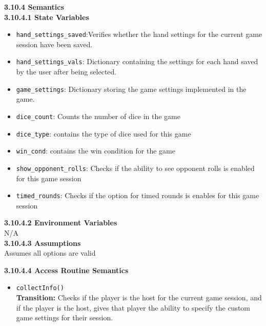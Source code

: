 \documentclass[12pt, titlepage]{article}
\begin{document}
\noindent \textbf{3.10.4 Semantics}\\
\textbf{3.10.4.1 State Variables}\\
\begin{itemize}
	\item \texttt{hand\_settings\_saved}:Verifies whether the hand settings for the current game session have been saved.
	\item \texttt{hand\_settings\_vals}: Dictionary containing the settings for each hand saved by the user after being selected.
	\item \texttt{game\_settings}: Dictionary storing the game settings implemented in the game.
	\item \texttt{dice\_count}: Counts the number of dice in the game
	\item \texttt{dice\_type}: contains the type of dice used for this game
	\item \texttt{win\_cond}: contains the win condition for the game
	\item \texttt{show\_opponent\_rolls}: Checks if the ability to see opponent rolls is enabled for this game session
	\item \texttt{timed\_rounds}: Checks if the option for timed rounds is enables for this game session

\end{itemize}

\textbf{3.10.4.2 Environment Variables}\\

N/A\\

\textbf{3.10.4.3 Assumptions}\\
Assumes all options are valid 

\textbf{3.10.4.4 Access Routine Semantics}
\begin{itemize}

	\item \texttt{collectInfo()}\\
	\textbf{Transition:} Checks if the player is the host for the current game session, and if the player is the host, gives that player the ability to specify the custom game settings for their session.

\end{itemize}
\end{document}
